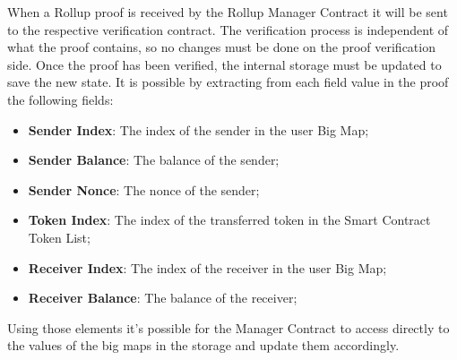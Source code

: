 When a Rollup proof is received by the Rollup Manager Contract it will be sent to the respective verification contract. The verification process is independent of what the proof contains, so no changes must be done on the proof verification side. Once the proof has been verified, the internal storage must be updated to save the new state. It is possible by extracting from each field value in the proof the following fields:
\vspace{-0.11in}
\begin{itemize}
	\item \textbf{Sender Index}: The index of the sender in the user Big Map;
	      \vspace{-0.11in}
	\item \textbf{Sender Balance}: The balance of the sender;
	      \vspace{-0.11in}
	\item \textbf{Sender Nonce}: The nonce of the sender;
	      \vspace{-0.11in}
	\item \textbf{Token Index}: The index of the transferred token in the Smart Contract Token List;
	      \vspace{-0.11in}
	\item \textbf{Receiver Index}: The index of the receiver in the user Big Map;
	      \vspace{-0.11in}
	\item \textbf{Receiver Balance}: The balance of the receiver;
\end{itemize}
Using those elements it's possible for the Manager Contract to access directly to the values of the big maps in the storage and update them accordingly.